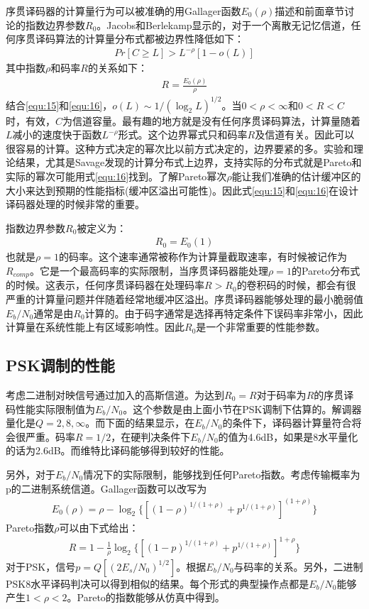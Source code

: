 \documentclass[twoside,numberorder]{buptthesis}
\begin{document}
序贯译码器的计算量行为可以被准确的用Gallager函数$E_0(\rho)$描述和前面章节讨论的指数边界参数$R_0$。Jacobs和Berlekamp显示的，对于一个离散无记忆信道，任何序贯译码算法的计算量分布式都被边界性降低如下：
\begin{eqnarray}
  Pr[C\ge L]>L^{-\rho}[1-o(L)]
  \label{equ:15}
\end{eqnarray}
其中指数$\rho$和码率$R$的关系如下：
\begin{eqnarray}
  R=\frac{E_0(\rho)}{\rho}
  \label{equ:16}
\end{eqnarray}
结合\ref{equ:15}和\ref{equ:16}，$o(L)\sim
1/(\log_2L)^{1/2}$。当$0<\rho<\infty$和$0<R<C$时，有效，$C$为信道容量。最有趣的地方就是没有任何序贯译码算法，计算量随着$L$减小的速度快于函数$L^{-\rho}$形式。这个边界幂式只和码率$R$及信道有关。因此可以很容易的计算。这种方式决定的幂次比以前方式决定的，边界要紧的多。实验和理论结果，尤其是Savage发现的计算分布式上边界，支持实际的分布式就是Pareto和实际的幂次可能用式\ref{equ:16}找到。了解Pareto幂次$\rho$能让我们准确的估计缓冲区的大小来达到预期的性能指标(缓冲区溢出可能性)。因此式\ref{equ:15}和\ref{equ:16}在设计译码器处理的时候非常的重要。

指数边界参数$R_0$被定义为：
\begin{eqnarray}
 R_0=E_0(1) 
  \label{equ:17}
\end{eqnarray}
也就是$\rho=1$的码率。这个速率通常被称作为计算量截取速率，有时候被记作为$R_{comp}$。它是一个最高码率的实际限制，当序贯译码器能处理$\rho=1$的Pareto分布式的时候。这表示，任何序贯译码器在处理码率$R>R_0$的卷积码的时候，都会有很严重的计算量问题并伴随着经常地缓冲区溢出。序贯译码器能够处理的最小脆弱值$E_b/N_0$通常是由$R_0$计算的。由于码字通常是选择再特定条件下误码率非常小，因此计算量在系统性能上有区域影响性。因此$R_0$是一个非常重要的性能参数。

\subsection{PSK调制的性能}
考虑二进制对映信号通过加入的高斯信道。为达到$R_0=R$对于码率为$R$的序贯译码性能实际限制值为$E_b/N_0$。这个参数是由上面小节在PSK调制下估算的。解调器量化是$Q=2,8,\infty$。而下面的结果显示，在$E_b/N_0$的条件下，译码器计算量符合将会很严重。码率$R=1/2$，在硬判决条件下$E_b/N_0$的值为4.6dB，如果是8水平量化的话为2.6dB。而维特比译码能够得到较好的性能。

另外，对于$E_b/N_0$情况下的实际限制，能够找到任何Pareto指数。考虑传输概率为p的二进制系统信道。Gallager函数可以改写为
\begin{eqnarray}
  E_0(\rho)=\rho-\log_2\{[(1-\rho)^{1/(1+\rho)}+p^{1/(1+\rho)}]^{(1+\rho)}\}
  \label{equ:18}
\end{eqnarray}
Pareto指数$\rho$可以由下式给出：
\begin{eqnarray}
  R=1-\frac{1}{\rho}\log_2\{[(1-p)^{1/(1+\rho)}+p^{1/(1+\rho)}]^{1+\rho}\}
  \label{equ:19}
\end{eqnarray}
对于PSK，信号$p=Q[(2E_s/N_0)^{1/2}]$。根据$E_b/N_0$与码率的关系。另外，二进制PSK8水平译码判决可以得到相似的结果。每个形式的典型操作点都是$E_b/N_0$能够产生$1<\rho<2$。Pareto的指数能够从仿真中得到。
\end{document}

